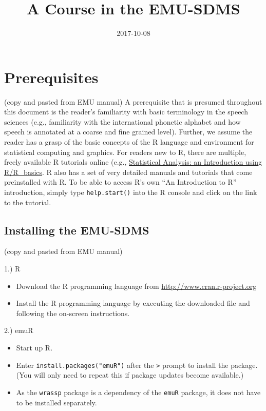\documentclass[]{book}
\title{A Course in the EMU-SDMS}
\author{}
\date{2017-10-08}
\providecommand{\tightlist}{%
  \setlength{\itemsep}{0pt}\setlength{\parskip}{0pt}}
\theoremstyle{definition}
\theoremstyle{definition}
\theoremstyle{definition}
\theoremstyle{remark}
\begin{document}
\maketitle

{
\setcounter{tocdepth}{1}
\tableofcontents
}
\chapter{Prerequisites}\label{prerequisites}

(copy and pasted from EMU manual) A prerequisite that is presumed
throughout this document is the reader's familiarity with basic
terminology in the speech sciences (e.g., familiarity with the
international phonetic alphabet and how speech is annotated at a coarse
and fine grained level). Further, we assume the reader has a grasp of
the basic concepts of the R language and environment for statistical
computing and graphics. For readers new to R, there are multiple, freely
available R tutorials online (e.g.,
\href{https://en.wikibooks.org/wiki/Statistical_Analysis:_an_Introduction_using_R/R_basics}{Statistical
Analysis: an Introduction using R/R\_basics}. R also has a set of very
detailed manuals and tutorials that come preinstalled with R. To be able
to access R's own ``An Introduction to R'' introduction, simply type
\texttt{help.start()} into the R console and click on the link to the
tutorial.

\section{Installing the EMU-SDMS}\label{installing-the-emu-sdms}

(copy and pasted from EMU manual)

1.) R

\begin{itemize}
\tightlist
\item
  Download the R programming language from
  \href{www.cran.r-project.org}{http://www.cran.r-project.org}
\item
  Install the R programming language by executing the downloaded file
  and following the on-screen instructions.
\end{itemize}

2.) emuR

\begin{itemize}
\tightlist
\item
  Start up R.
\item
  Enter \texttt{install.packages("emuR")} after the
  \texttt{\textgreater{}} prompt to install the package. (You will only
  need to repeat this if package updates become available.)
\item
  As the \texttt{wrassp} package is a dependency of the \texttt{emuR}
  package, it does not have to be installed separately.
\end{itemize}
\end{document}
